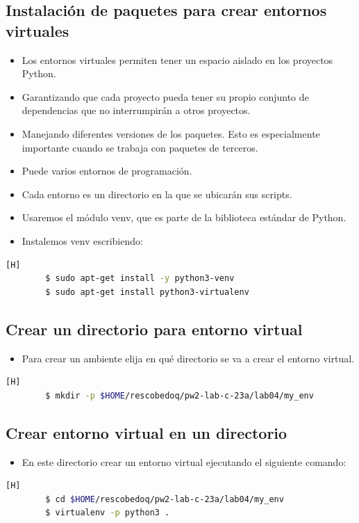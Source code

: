 \documentclass{article}
\begin{document}
	\subsection{Instalación de paquetes para crear entornos virtuales}
	\begin{itemize}
		\item Los entornos virtuales permiten tener un espacio aislado en los proyectos Python.
		\item Garantizando que cada proyecto pueda tener su propio conjunto de dependencias que no interrumpirán a otros proyectos.
		\item Manejando diferentes versiones de los paquetes. Esto es especialmente importante cuando se trabaja con paquetes de terceros.
		\item Puede varios entornos de programación.
		\item Cada entorno es un directorio en la que se ubicarán sus scripts.
		\item Usaremos el módulo venv, que es parte de la biblioteca estándar de Python.
		\item Instalemos venv escribiendo:
	\end{itemize}
	\begin{lstlisting}[language=bash,caption={Instalación del entorno virtual}][H]
		$ sudo apt-get install -y python3-venv
		$ sudo apt-get install python3-virtualenv
	\end{lstlisting}
	
	\subsection{Crear un directorio para entorno virtual}
	\begin{itemize}
		\item Para crear un ambiente elija en qué directorio se va a crear el entorno virtual.
	\end{itemize}
	\begin{lstlisting}[language=bash,caption={Creando directorio para entorno virtual}][H]
		$ mkdir -p $HOME/rescobedoq/pw2-lab-c-23a/lab04/my_env
	\end{lstlisting}
	
	\subsection{Crear entorno virtual en un directorio}
	\begin{itemize}
		\item En este directorio crear un entorno virtual ejecutando el siguiente comando:
	\end{itemize}
	\begin{lstlisting}[language=bash,caption={Creando entorno virtual}][H]
		$ cd $HOME/rescobedoq/pw2-lab-c-23a/lab04/my_env
		$ virtualenv -p python3 .
	\end{lstlisting}
	
\end{document}
